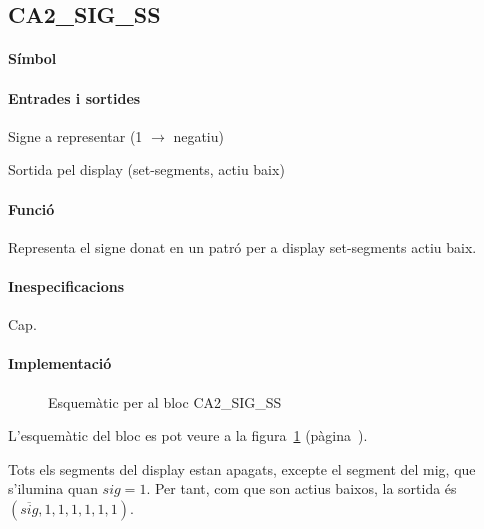 \subsection{\label{sub:\projectname-CA2_SIG_SS} \textsf{CA2\_SIG\_SS}}

\paragraph{Símbol}
\begin{center}  \end{center}

\paragraph{Entrades i sortides}

\begin{where}
\item[\nodenamebit{sig}] Signe a representar (1 $\rightarrow$ negatiu)
\item[\nodenamerange{ss}{6}{0}] Sortida pel display (set-segments, actiu baix)
\end{where}

\paragraph{Funció}

Representa el signe donat en un patró per a display set-segments actiu baix.

\paragraph{Inespecificacions}

Cap.

\paragraph{Implementació}

\begin{figure}[b]
  \begin{center}
  \end{center}
  \caption{\label{fig:\projectname-CA2_SIG_SS} Esquemàtic per al bloc \textsf{CA2\_SIG\_SS}}
\end{figure}

L'esquemàtic del bloc es pot veure a la figura~\ref{fig:\projectname-CA2_SIG_SS} (pàgina~\pageref{fig:\projectname-CA2_SIG_SS}).

Tots els segments del display estan apagats, excepte el segment del mig, que
s'ilumina quan $sig = 1$. Per tant, com que son actius baixos, la sortida és
$(\overline{sig}, 1, 1, 1, 1, 1, 1)$.

\vspace{1cm}
